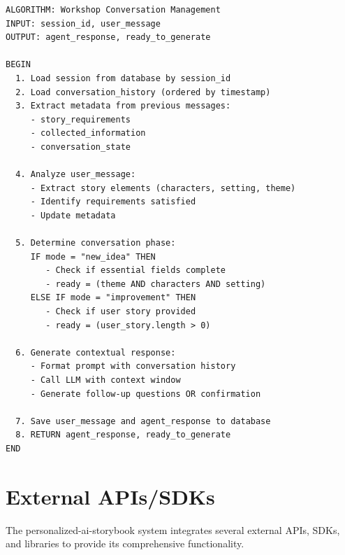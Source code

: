 \begin{verbatim}
ALGORITHM: Workshop Conversation Management
INPUT: session_id, user_message
OUTPUT: agent_response, ready_to_generate

BEGIN
  1. Load session from database by session_id
  2. Load conversation_history (ordered by timestamp)
  3. Extract metadata from previous messages:
     - story_requirements
     - collected_information
     - conversation_state
  
  4. Analyze user_message:
     - Extract story elements (characters, setting, theme)
     - Identify requirements satisfied
     - Update metadata
  
  5. Determine conversation phase:
     IF mode = "new_idea" THEN
        - Check if essential fields complete
        - ready = (theme AND characters AND setting)
     ELSE IF mode = "improvement" THEN
        - Check if user story provided
        - ready = (user_story.length > 0)
  
  6. Generate contextual response:
     - Format prompt with conversation history
     - Call LLM with context window
     - Generate follow-up questions OR confirmation
  
  7. Save user_message and agent_response to database
  8. RETURN agent_response, ready_to_generate
END
\end{verbatim}

\section{External APIs/SDKs}

The personalized-ai-storybook system integrates several external APIs, SDKs, and libraries to provide its comprehensive functionality.

